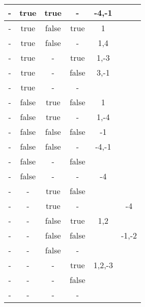 \begin{longtable}{|c|c|c|c|c|c|}
- & true & true & - & -4,-1           &    \\ \hline 
- & true & false & true & 1               &    \\ \hline 
- & true & false & - & 1,4             &    \\ \hline 
- & true & - & true & 1,-3            &    \\ \hline 
- & true & - & false & 3,-1            &    \\ \hline 
- & true & - & - &                 &    \\ \hline 
- & false & true & false & 1               &    \\ \hline 
- & false & true & - & 1,-4            &    \\ \hline 
- & false & false & false & -1              &    \\ \hline 
- & false & false & - & -4,-1           &    \\ \hline 
- & false & - & false &                 &    \\ \hline 
- & false & - & - & -4              &    \\ \hline 
- & - & true & false &                 &    \\ \hline 
- & - & true & - &                 & -4 \\ \hline 
- & - & false & true & 1,2             &    \\ \hline 
- & - & false & false &                 & -1,-2\\ \hline 
- & - & false & - &                 &    \\ \hline 
- & - & - & true & 1,2,-3          &    \\ \hline 
- & - & - & false &                 &    \\ \hline 
- & - & - & - &                 &    \\ \hline 
\end{longtable}
